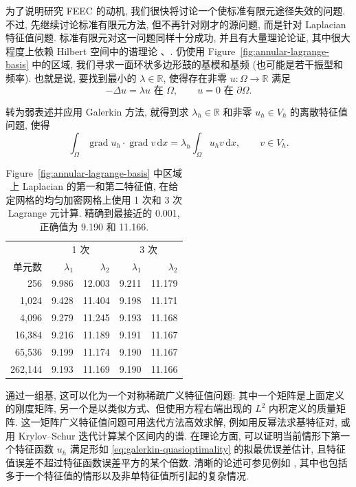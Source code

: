 为了说明研究 FEEC 的动机, 我们很快将讨论一个使标准有限元途径失效的问题. 不过, 先继续讨论标准有限元方法, 但不再针对刚才的源问题, 而是针对 Laplacian 特征值问题. 标准有限元对这一问题同样十分成功, 并且有大量理论论证, 其中很大程度上依赖 Hilbert 空间中的谱理论 、. 仍使用 Figure~\ref{fig:annular-lagrange-basis} 中的区域, 我们寻求一面环状多边形鼓的基模和基频 (也可能是若干振型和频率). 也就是说, 要找到最小的 $\lambda\in\mathbb R$, 使得存在非零 $u:\Omega\to\mathbb R$ 满足
\begin{equation}\label{eq:scalar-laplacian-eigenproblem}
-\Delta u=\lambda u\text{{ 在 }}\Omega,\qquad u=0\text{{ 在 }}\partial\Omega.
\end{equation}

转为弱表述并应用 Galerkin 方法, 就得到求 $\lambda_h\in\mathbb R$ 和非零 $u_h\in V_h$ 的离散特征值问题, 使得
\[
\int_\Omega\operatorname{grad}u_h\cdot\operatorname{grad}v\,\mathrm{d}x=\lambda_h\int_\Omega u_hv\,\mathrm{d}x,\qquad v\in V_h.
\]

\begin{table}[H]\centering
\caption{Figure~\ref{fig:annular-lagrange-basis} 中区域上 Laplacian 的第一和第二特征值, 在给定网格的均匀加密网格上使用 1 次和 3 次 Lagrange 元计算. 精确到最接近的 0.001, 正确值为 9.190 和 11.166.}\label{tab:scalar-laplacian-eigenvalues}
\renewcommand{\arraystretch}{1.0}
\setlength{\tabcolsep}{14pt}
\begin{tabular}{r|rr|rr}\hline
&\multicolumn{2}{c|}{{1 次}}&\multicolumn{2}{c}{{3 次}}\\
单元数&$\lambda_1$&$\lambda_2$&$\lambda_1$&$\lambda_2$\\\hline
256&9.986&12.003&9.211&11.179\\
1,024&9.428&11.404&9.198&11.171\\
4,096&9.279&11.245&9.193&11.168\\
16,384&9.216&11.189&9.191&11.167\\
65,536&9.199&11.174&9.190&11.167\\
262,144&9.193&11.169&9.190&11.166\\\hline
\end{tabular}
\end{table}

通过一组基, 这可以化为一个对称稀疏广义特征值问题: 其中一个矩阵是上面定义的刚度矩阵, 另一个是以类似方式、但使用方程右端出现的 $L^2$ 内积定义的质量矩阵. 这一矩阵广义特征值问题可用迭代方法高效求解, 例如用反幂法求基特征对, 或用 Krylov–Schur 迭代计算某个区间内的谱. 在理论方面, 可以证明当前情形下第一个特征函数 $u_h$ 满足形如 \eqref{eq:galerkin-quasioptimality} 的拟最优误差估计, 且特征值误差不超过特征函数误差平方的某个倍数. 清晰的论述可参见例如 , 其中也包括多于一个特征值的情形以及非单特征值所引起的复杂情况.


